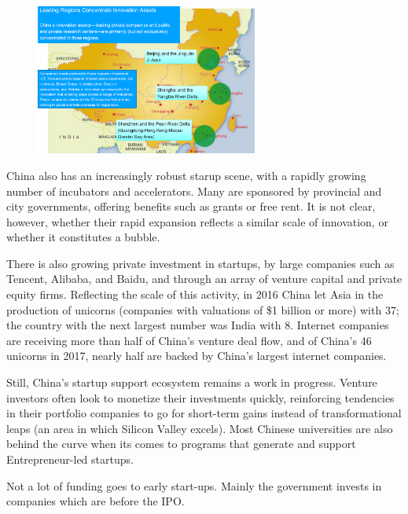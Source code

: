 \begin{figure}[H]
    \centering
    \includegraphics[width=0.65\textwidth]{Pictures/china_innovationhubs.png}
\end{figure}

China also has an increasingly robust starup scene, with a rapidly growing number
of incubators and accelerators. Many are sponsored by provincial and city
governments, offering benefits such as grants or free rent. It is not clear,
however, whether their rapid expansion reflects a similar scale of innovation,
or whether it constitutes a bubble.

\vspace{1\baselineskip}

There is also growing private investment in startups, by large companies such as
Tencent, Alibaba, and Baidu, and through an array of venture capital and private
equity firms. Reflecting the scale of this activity, in 2016 China let Asia in
the production of unicorns (companies with valuations of \$1 billion or more)
with 37; the country with the next largest number was India with 8. Internet
companies are receiving more than half of China's venture deal flow, and of
China's 46 unicorns in 2017, nearly half are backed by China's largest
internet companies.

\vspace{1\baselineskip}

Still, China's startup support ecosystem remains a work in progress. Venture
investors often look to monetize their investments quickly, reinforcing
tendencies in their portfolio companies to go for short-term gains instead
of transformational leaps (an area in which Silicon Valley excels). Most
Chinese universities are also behind the curve when its comes to programs that
generate and support Entrepreneur-led startups.

\vspace{1\baselineskip}

Not a lot of funding goes to early start-ups. Mainly the government invests
in companies which are before the IPO.

